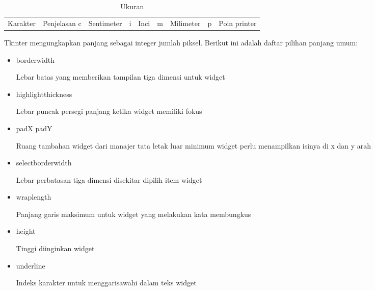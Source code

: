 \begin{itemize}


\begin{table}[ht]
	\caption{Ukuran}
	\begin{tabular*}{\textwidth}{@{\extracolsep{\fill}}lcc}
		\hline
		Karakter&  Penjelasan \cr
		\hline
		c&Sentimeter&\cr
		i&Inci&\cr
		m&Milimeter&\cr
		p&Poin printer\cr
		\hline
	\end{tabular*}
	\begin{tablenotes}
	\end{tablenotes}
\end{table}




 \hspace*{0.5in} \vspace{12pt}
 \hspace*{0.5in} Tkinter mengungkapkan panjang sebagai integer jumlah piksel. Berikut ini adalah daftar pilihan panjang umum: \par
\noindent 
\begin{itemize}
\item borderwidth \par
Lebar batas yang memberikan tampilan tiga dimensi untuk widget \par
\noindent 
\item highlightthickness \par
Lebar puncak persegi panjang ketika widget memiliki fokus \par
\noindent 
\item padX padY \par
Ruang tambahan widget dari manajer tata letak luar minimum widget perlu menampilkan isinya di x dan y arah \par
\noindent 
\item selectborderwidth \par
Lebar perbatasan tiga dimensi disekitar dipilih item widget \par
\noindent 
\item wraplength \par
Panjang garis maksimum untuk widget yang melakukan kata membungkus \par
\noindent 
\item height \par
Tinggi diinginkan widget \par
\noindent 
\item underline \par
Indeks karakter untuk menggarisawahi dalam teks widget  \par

\end{itemize}
\end{itemize}
